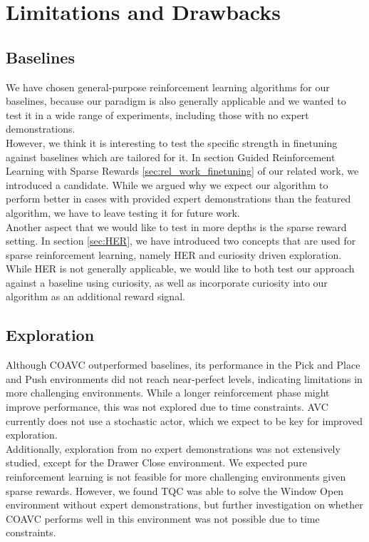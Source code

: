 \section{Limitations and Drawbacks}
\subsection{Baselines}
We have chosen general-purpose reinforcement learning algorithms for our baselines, because our paradigm is also generally applicable 
and we wanted to test it in a wide range of experiments, including those with no expert demonstrations.\\ 

However, we think it is interesting to test the specific strength in finetuning against baselines which are 
tailored for it. In section Guided Reinforcement Learning with Sparse Rewards \ref{sec:rel_work_finetuning} of our related work, we introduced 
a candidate. While we argued why we expect our algorithm to perform better in cases with provided expert demonstrations than the featured algorithm, we have to 
leave testing it for future work.\\

Another aspect that we would like to test in more depths is the sparse reward setting. In section \ref{sec:HER}, we have introduced two concepts that are used for sparse reinforcement learning, namely 
HER and curiosity driven exploration. While HER is not generally applicable, we would like to both test our approach against a baseline using curiosity, as well as incorporate 
curiosity into our algorithm as an additional reward signal. 

\subsection{Exploration}
Although COAVC outperformed baselines, its performance in the Pick and Place and Push environments did not reach near-perfect levels, 
indicating limitations in more challenging environments. While a longer reinforcement phase might improve performance, this was not explored 
due to time constraints. AVC currently does not use a stochastic actor, which we expect to be key for improved exploration.\\ 

Additionally, exploration from no expert demonstrations was not extensively studied, except for the Drawer Close 
environment. We expected pure reinforcement learning is not feasible for more challenging environments given sparse rewards. 
However, we found TQC was able to solve the Window Open environment without expert demonstrations, but further investigation on whether 
COAVC performs well in this environment was not possible due to time constraints.\\ 

